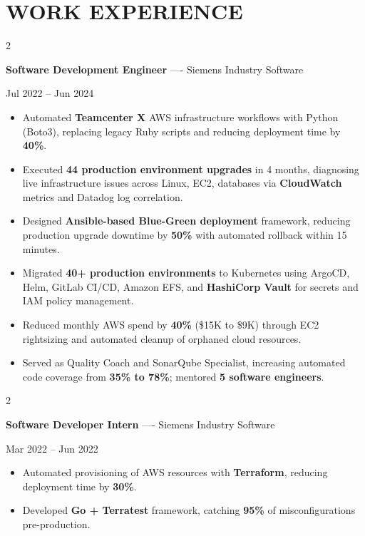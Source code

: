 \documentclass[10pt, letterpaper]{article}
\newenvironment{highlights}{
    \begin{itemize}[
        topsep=0.10 cm,
        parsep=0.06 cm,
        partopsep=0pt,
        itemsep=0.06 cm,
        leftmargin=12pt
    ]
}{
    \end{itemize}
}
\newenvironment{twocolentry}[2][]{
    \onecolentry
    \def\secondColumn{#2}
    \setcolumnwidth{\fill, 4.5 cm}
    \begin{paracol}{2}
}{
    \switchcolumn \raggedleft \secondColumn
    \end{paracol}
    \endonecolentry
}
\begin{document}
\section{WORK EXPERIENCE}
\begin{twocolentry}{Jul 2022 -- Jun 2024}
\textbf{Software Development Engineer} ---- Siemens Industry Software
\end{twocolentry}
\begin{highlights}
  \item Automated \textbf{Teamcenter X} AWS infrastructure workflows with Python (Boto3), replacing legacy Ruby scripts and reducing deployment time by \textbf{40\%}.
  \item Executed \textbf{44 production environment upgrades} in 4 months, diagnosing live infrastructure issues across Linux, EC2, databases via \textbf{CloudWatch} metrics and Datadog log correlation.
  \item Designed \textbf{Ansible-based Blue-Green deployment} framework, reducing production upgrade downtime by \textbf{50\%} with automated rollback within 15 minutes.
  \item Migrated \textbf{40+ production environments} to Kubernetes using ArgoCD, Helm, GitLab CI/CD, Amazon EFS, and \textbf{HashiCorp Vault} for secrets and IAM policy management.
  \item Reduced monthly AWS spend by \textbf{40\%} (\$15K to \$9K) through EC2 rightsizing and automated cleanup of orphaned cloud resources.
  \item Served as Quality Coach and SonarQube Specialist, increasing automated code coverage from \textbf{35\% to 78\%}; mentored \textbf{5 software engineers}.
\end{highlights}

\vspace{0.15 cm}

\begin{twocolentry}{Mar 2022 -- Jun 2022}
\textbf{Software Developer Intern} ---- Siemens Industry Software
\end{twocolentry}
\begin{highlights}
  \item Automated provisioning of AWS resources with \textbf{Terraform}, reducing deployment time by \textbf{30\%}.
  \item Developed \textbf{Go + Terratest} framework, catching \textbf{95\%} of misconfigurations pre-production.
\end{highlights}
\end{document}
